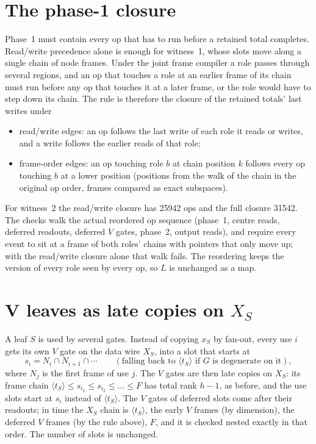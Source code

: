\documentclass[11pt]{article}
\theoremstyle{remark}\newtheorem*{remark}{Remark}
\begin{document}
\section{The phase-1 closure}\label{sec:closure}
Phase~1 must contain every op that has to run before a retained total completes. Read/write precedence alone is
enough for witness~1, whose slots move along a single chain of node frames. Under the joint frame compiler a role
passes through several regions, and an op that touches a role at an earlier frame of its chain must run before any
op that touches it at a later frame, or the role would have to step down its chain. The rule is therefore the
closure of the retained totals' last writes under
\begin{itemize}
\item read/write edges: an op follows the last write of each role it reads or writes, and a write follows the
  earlier reads of that role;
\item frame-order edges: an op touching role $b$ at chain position $k$ follows every op touching $b$ at a lower
  position (positions from the walk of the chain in the original op order, frames compared as exact subspaces).
\end{itemize}
For witness~2 the read/write closure has 25942 ops and the full closure 31542. The checks walk the actual reordered
op sequence (phase~1, centre reads, deferred readouts, deferred $V$ gates, phase~2, output reads), and require every
event to sit at a frame of both roles' chains with pointers that only move up; with the read/write closure alone that
walk fails. The reordering keeps the version of every role seen by every op, so $L$ is unchanged as a map.

\section{V leaves as late copies on $X_S$}
A leaf $S$ is used by several gates. Instead of copying $x_S$ by fan-out, every use $i$ gets its own $V$ gate on the
data wire $X_S$, into a slot that starts at
\[ s_i=N_i\cap N_{i+1}\cap\cdots \qquad(\text{falling back to }\langle t_S\rangle\text{ if $G$ is degenerate on it}), \]
where $N_j$ is the first frame of use $j$. The $V$ gates are then late copies on $X_S$: its frame chain
$\langle t_S\rangle\le s_{i_1}\le s_{i_2}\le\dots\le F$ has total rank $h-1$, as before, and the use slots start at
$s_i$ instead of $\langle t_S\rangle$. The $V$ gates of deferred slots come after their readouts; in time the $X_S$ chain
is $\langle t_S\rangle$, the early $V$ frames (by dimension), the deferred $V$ frames (by the rule above), $F$, and it
is checked nested exactly in that order. The number of slots is unchanged.
\end{document}
